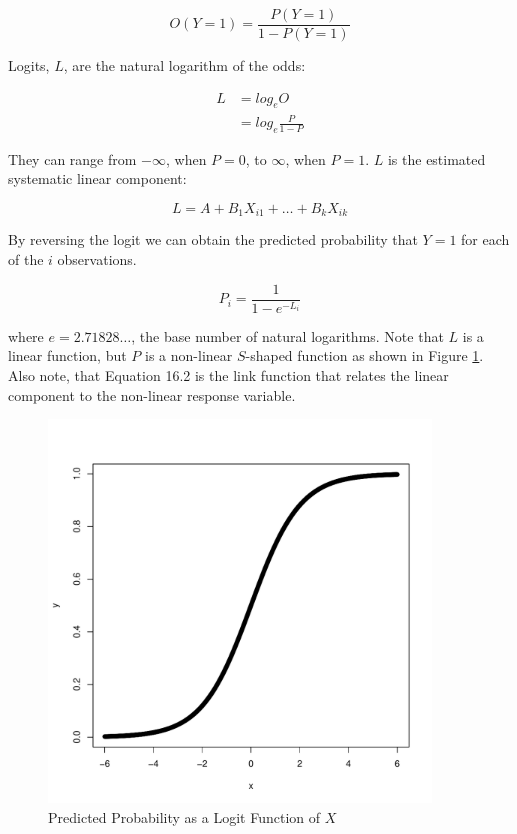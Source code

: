 \documentclass[11pt,openany]{book}\usepackage[]{graphicx}\usepackage[]{color}
\begin{document}
{\begin{equation*}
  O(Y=1)=\frac{P(Y=1)}{1-P(Y=1)}
\end{equation*}

\noindent Logits, $L$, are the natural logarithm of the odds: 

\begin{align*}
  L &= log_e O \\
  &=log_e \frac{P}{1-P}
\end{align*}

\noindent They can range from $-\infty$, when $P=0$, to $\infty$, when
$P=1$. $L$ is the estimated systematic linear component: 

\begin{equation*}
  L = A+B_1 X_{i1}+\ldots+B_k X_{ik}
\end{equation*}

\noindent By reversing the logit we can obtain the predicted
probability that $Y=1$ for each of the $i$ observations. 

\begin{equation}
  \label{eq:predprob}
  P_{i} = \frac{1}{1-e^{-L_{i}}}
\end{equation}

\noindent where $e=2.71828 \ldots$, the base number of natural
logarithms. Note that $L$ is a linear function, but $P$ is a non-linear
$S$-shaped function as shown in Figure \ref{fig:logex}. Also note,
that Equation 16.2 is the link function that relates the
linear component to the non-linear response variable.  

\begin{figure}
        \centering
        \includegraphics[width=4in]{16_Logit/logex.pdf}%
        \caption{Predicted Probability as a Logit Function of $X$ \label{fig:logex}}
\end{figure}   

}
\end{document}
